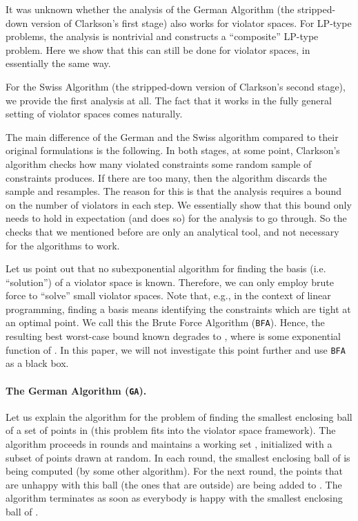 \documentclass[12pt]{article}
\theoremstyle{remark}
\def\stageI{\texttt{GA}}
\def\stageIII{\texttt{BFA}}
\begin{document}
It was unknown whether the analysis of the German Algorithm (the
stripped-down version of Clarkson's first stage) also works for
violator spaces. For LP-type problems, the analysis is nontrivial and
constructs a ``composite'' LP-type problem. Here we show that this can
still be done for violator spaces, in essentially the same way.

For the Swiss Algorithm (the stripped-down version of Clarkson's
second stage), we provide the first analysis at all. The fact that it
works in the fully general setting of violator spaces comes naturally.

The main difference of the German and the Swiss algorithm compared
to their original formulations is the following. In both stages, at some point,
Clarkson's algorithm checks how many violated constraints some random
sample of constraints produces.
If there are too many, then the algorithm discards the sample and resamples.
The reason for this is that the analysis requires a bound on the number of
violators in each step. We essentially show that this bound only needs to hold
in expectation (and does so) for the analysis to go through.
So the  checks that we mentioned before are only an analytical tool, and not necessary for
the algorithms to work.

Let us point out that no subexponential
algorithm for finding the basis (i.e. ``solution'') of a violator space is known. Therefore,
we can only employ brute force to ``solve'' small violator spaces. Note that,
e.g., in the context of linear programming, finding a basis means identifying the
constraints which are tight at an optimal point. We
call this the Brute Force Algorithm (\stageIII). Hence, the resulting best
worst-case bound known degrades to , where  is
some exponential function of . In this paper, we will not investigate
this point further and use \stageIII{ }as a black box.

\paragraph{The German Algorithm (\stageI).}
Let us explain the algorithm for the problem of finding the smallest
enclosing ball of a set of  points in  (this problem fits
into the violator space framework). The algorithm proceeds in rounds
and maintains a working set , initialized with a subset  of 
points drawn at random. In each round, the smallest enclosing ball of
 is being computed (by some other algorithm). For the next round,
the points that are unhappy with this ball (the ones that are outside)
are being added to . The algorithm terminates as soon as everybody
is happy with the smallest enclosing ball of .
\end{document}
